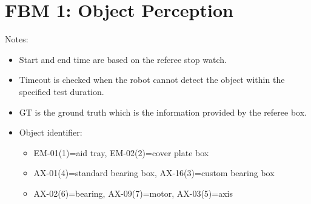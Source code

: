 \section*{FBM 1: Object Perception}


\noindent Notes:
\begin{itemize}
\item Start and end time are based on the referee stop watch.
\item Timeout is checked when the robot cannot detect the object within the specified test duration.
\item GT is the ground truth which is the information provided by the referee box.
\item Object identifier:
	\begin{itemize}
		\item EM-01(1)=aid tray, EM-02(2)=cover plate box
		\item AX-01(4)=standard bearing box, AX-16(3)=custom bearing box
		\item AX-02(6)=bearing, AX-09(7)=motor, AX-03(5)=axis
	\end{itemize}
\end{itemize}

\vspace{0.5cm}

\\

\newpage
{}\\
\\
\\

\newpage
{}\\
\\
\\

\newpage
{}\\
\\


